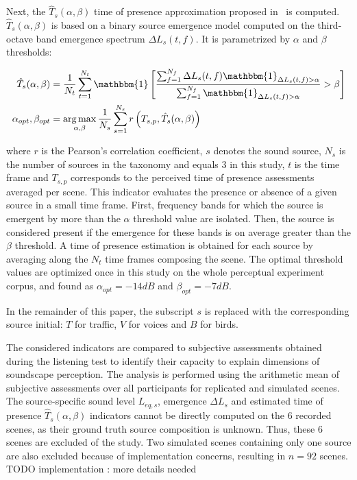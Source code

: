 \documentclass[twocolumn]{article}
\DeclareMathOperator*{\argmax}{arg\,max}
\begin{document}
Next, the $\hat T_s(\alpha, \beta)$ time of presence approximation proposed in~\cite{gontier2018} is computed. $\hat T_s(\alpha, \beta)$ is based on a binary source emergence model computed on the third-octave band emergence spectrum $\Delta L_{s}(t, f)$. It is parametrized by $\alpha$ and $\beta$ thresholds:

\begin{align}\label{eq:ts}
\hat T_s(\alpha, \beta) &= \frac{1}{N_t}\sum_{t = 1}^{N_t}\mathbbm{1}\left[ \frac{\sum_{f = 1}^{N_f}\Delta L_{s}(t, f)\mathbbm{1}_{\Delta L_{s}(t, f)>\alpha}}{\sum_{f = 1}^{N_f}\mathbbm{1}_{\Delta L_{s}(t, f)>\alpha}}>\beta \right]\\
\alpha_{opt},\beta_{opt} &= \argmax_{\alpha, \beta}\frac{1}{N_s}\sum_{s = 1}^{N_s}r\left(T_{s, p}, \hat T_s(\alpha, \beta)\right)
\end{align}

where $r$ is the Pearson's correlation coefficient, $s$ denotes the sound source, $N_s$ is the number of sources in the taxonomy and equals 3 in this study, $t$ is the time frame and $T_{s, p}$ corresponds to the perceived time of presence assessments averaged per scene. This indicator evaluates the presence or absence of a given source in a small time frame. First, frequency bands for which the source is emergent by more than the $\alpha$ threshold value are isolated. Then, the source is considered present if the emergence for these bands is on average greater than the $\beta$ threshold. A time of presence estimation is obtained for each source by averaging along the $N_t$ time frames composing the scene. The optimal threshold values are optimized once in this study on the whole perceptual experiment corpus, and found as $\alpha_{opt} = -14dB$ and $\beta_{opt} = -7dB$.

In the remainder of this paper, the subscript $s$ is replaced with the corresponding source initial: $T$ for traffic, $V$ for voices and $B$ for birds.

The considered indicators are compared to subjective assessments obtained during the listening test to identify their capacity to explain dimensions of soundscape perception. The analysis is performed using the arithmetic mean of subjective assessments over all participants for replicated and simulated scenes. The source-specific sound level $L_{eq, s}$, emergence $\Delta L_{s}$ and estimated time of presence $\hat T_s(\alpha, \beta)$ indicators cannot be directly computed on the 6 recorded scenes, as their ground truth source composition is unknown. Thus, these 6 scenes are excluded of the study. Two simulated scenes containing only one source are also excluded because of implementation concerns, resulting in $n=92$ scenes.  TODO implementation : more details needed
\end{document}
